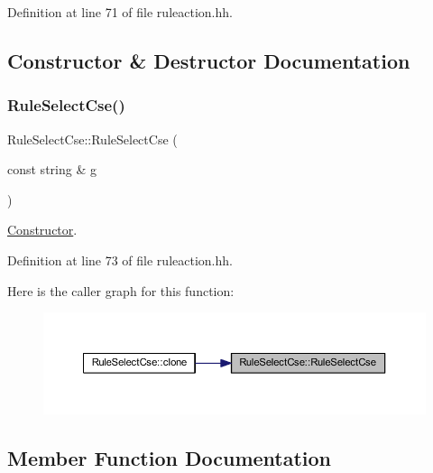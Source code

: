 Definition at line 71 of file ruleaction.\+hh.



\subsection{Constructor \& Destructor Documentation}
\mbox{\label{class_rule_select_cse_aaf3f9e25cfa07366d4e00e32f41cea5a}} 
\subsubsection{\texorpdfstring{RuleSelectCse()}{RuleSelectCse()}}
{\footnotesize\ttfamily Rule\+Select\+Cse\+::\+Rule\+Select\+Cse (\begin{DoxyParamCaption}\item[{const string \&}]{g }\end{DoxyParamCaption})\hspace{0.3cm}{\ttfamily [inline]}}



\mbox{\hyperlink{class_constructor}{Constructor}}. 



Definition at line 73 of file ruleaction.\+hh.

Here is the caller graph for this function\+:
\nopagebreak
\begin{figure}[H]
\begin{center}
\leavevmode
\includegraphics[width=350pt]{class_rule_select_cse_aaf3f9e25cfa07366d4e00e32f41cea5a_icgraph}
\end{center}
\end{figure}


\subsection{Member Function Documentation}
\mbox{\label{class_rule_select_cse_a2b1b3ea7c8acf61be61ab068385ec967}} 
